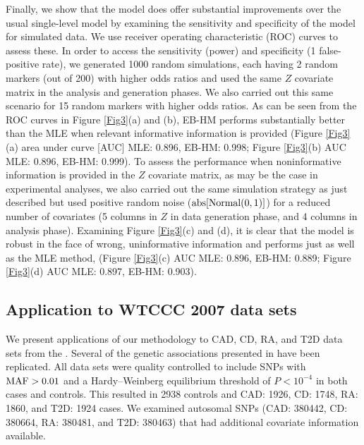\documentclass[oupdraft]{bio}
\begin{document}
Finally, we show that the model does offer substantial
improvements over the usual single-level model by examining
the sensitivity and specificity of the model for simulated
data. We use receiver operating characteristic (ROC)
curves to assess these. In order to access the sensitivity
(power) and specificity (1 false-positive rate), we
generated 1000 random simulations, each having 2 random
markers (out of 200) with higher odds ratios and used the
same $Z$ covariate matrix in the analysis and generation
phases. We also carried out this same scenario for 15
random markers with higher odds ratios. As can be seen
from the ROC curves in Figure \ref{Fig3}(a) and (b),
EB-HM performs substantially better than the MLE when
relevant informative information is provided
(Figure \ref{Fig3}(a) area under curve [AUC] MLE: 0.896,
EB-HM: 0.998; Figure \ref{Fig3}(b) AUC MLE: 0.896,
EB-HM: 0.999). To assess the performance when
noninformative information is provided in the $Z$
covariate matrix, as may be the case in experimental
analyses, we also carried out the same simulation strategy
as just described but used positive random noise
($\hbox{abs} [ \hbox{Normal} (0, 1) ]$) for a reduced
number of covariates (5 columns in $Z$ in data generation
phase, and 4 columns in analysis phase). Examining
Figure \ref{Fig3}(c) and (d), it is clear that the model
is robust in the face of wrong, uninformative information
and performs just as well as the MLE method,
(Figure \ref{Fig3}(c) AUC MLE: 0.896, EB-HM: 0.889;
Figure \ref{Fig3}(d) AUC MLE: 0.897, EB-HM: 0.903).


\subsection{Application to WTCCC 2007 data sets}

We present applications of our methodology to CAD, CD,
RA, and T2D data sets from the
\cite{SAS_Institute:1999}.
Several of the genetic associations presented in
\citet{Brown:1989}
have been replicated. All data sets were quality controlled
to include SNPs with $\hbox{MAF} > 0.01$ and a
Hardy--Weinberg equilibrium threshold of $P < 10^{-4}$ in
both cases and controls. This resulted in 2938 controls
and CAD: 1926, CD: 1748, RA: 1860, and T2D: 1924 cases.
We examined autosomal SNPs (CAD: 380442, CD: 380664,
RA: 380481, and T2D: 380463) that had additional covariate
information available.
\end{document}
